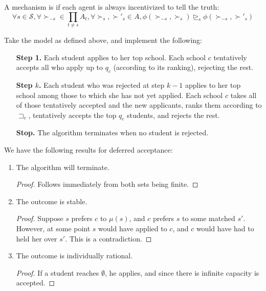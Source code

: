 \documentclass[10pt]{article}
\begin{document}
\begin{definition}
	A mechanism is  if each agent is always incentivized to tell the truth:\[\forall s \in \mathcal{S} , \forall \succ_{-s} \in \prod_{t \ne s}A_t , \forall \succ_s,\succ'_s \in A, \phi(\succ_{-s},\succ_s) \unrhd_s \phi(\succ_{-s},\succ'_s)\]
\end{definition}
\begin{algorithm}
	 Take the model as defined above, and implement the following:
	\begin{itemize}
		\item[\textbf{Step 1.}] Each student applies to her top school. Each school $c$ tentatively accepts all who apply up to $q_c$ (according to its ranking), rejecting the rest.
		\item[\textbf{Step $k$.}] Each student who was rejected at step $k-1$ applies to her top school among those to which she has not yet applied. Each school $c$ takes all of those tentatively accepted and the new applicants, ranks them according to $\sqsupset_c$, tentatively accepts the top $q_c$ students, and rejects the rest.
		\item[\textbf{Stop.}] The algorithm terminates when no student is rejected.
	\end{itemize}
\end{algorithm}
\begin{remark}
	We have the following results for deferred acceptance:
	\begin{enumerate}
		\item The algorithm will terminate. \\\begin{proof} Follows immediately from both sets being finite. \end{proof}
		\item The outcome is stable. \\\begin{proof} Suppose $s$ prefers $c$ to $\mu(s)$, and $c$ prefers $s$ to some matched $s'$. However, at some point $s$ would have applied to $c$, and $c$ would have had to held her over $s'$. This is a contradiction.\end{proof}
		\item The outcome is individually rational.\\\begin{proof} If a student reaches $\emptyset$, he applies, and since there is infinite capacity is accepted.\end{proof}
	\end{enumerate}
\end{remark}
\end{document}
